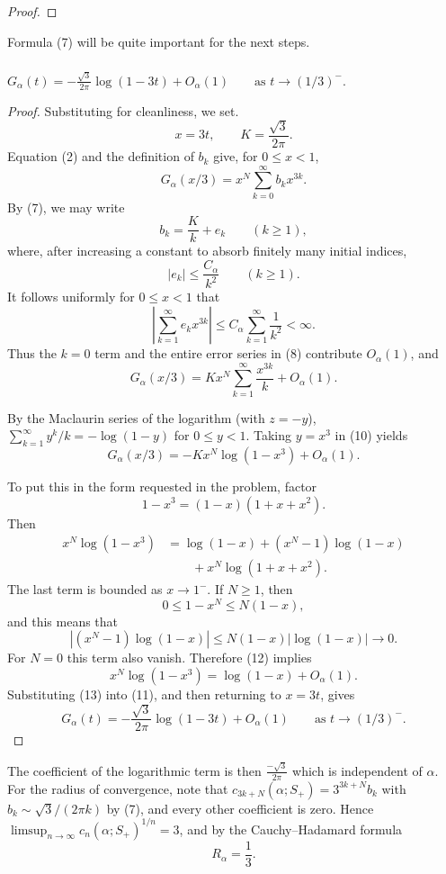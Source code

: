 \documentclass[11pt]{scrartcl}
\begin{document}
\begin{soln}
\begin{proof}
    \end{proof}

	Formula (7) will be quite important for the next steps.






	\subsubsection*{}
	
    \begin{claim*}
       $ G_\alpha(t)
		=-\frac{\sqrt3}{2\pi}\log(1-3t)+O_\alpha(1)
		\qquad\text{as }t\to(1/3)^-$.
    \end{claim*}
    \begin{proof}
        
	Substituting for cleanliness, we set. 
	\[
	x=3t,
	\qquad
	K=\frac{\sqrt3}{2\pi}.
	\]
	Equation (2) and the definition of $b_k$ give, for $0\le x<1$,
	\[
	G_\alpha(x/3)=x^N\sum_{k=0}^{\infty}b_kx^{3k}.
	\tag{8}
	\]
	By (7), we may write
	\[
	b_k=\frac{K}{k}+e_k
	\qquad(k\ge1),
	\]
	where, after increasing a constant to absorb finitely many initial
	indices,
	\[
	|e_k|\le\frac{C_\alpha}{k^2}
	\qquad(k\ge1).
	\tag{9}
	\]
	It follows uniformly for $0\le x<1$ that
	\[
	\left|\sum_{k=1}^{\infty}e_kx^{3k}\right|
	\le C_\alpha\sum_{k=1}^{\infty}\frac1{k^2}
	<\infty.
	\]
	Thus the $k=0$ term and the entire error series in (8) contribute
	$O_\alpha(1)$, and
	\[
	G_\alpha(x/3)
	=Kx^N\sum_{k=1}^{\infty}\frac{x^{3k}}{k}
	+O_\alpha(1).
	\tag{10}
	\]
	
	By the Maclaurin series of the logarithm \cite[(4.6.1)]{dlmf}
(with $z=-y$), $\sum_{k=1}^{\infty}y^k/k=-\log(1-y)$ for $0\le y<1$.
Taking $y=x^3$ in (10) yields
\[
G_\alpha(x/3)=-Kx^N\log(1-x^3)+O_\alpha(1).
\tag{11}
\]
	
	To put this in the form requested in the problem, factor
	\[
	1-x^3=(1-x)(1+x+x^2).
	\]
	Then
	\begin{align*}
		x^N\log(1-x^3)
		&=\log(1-x)+(x^N-1)\log(1-x)\\
		&\qquad+x^N\log(1+x+x^2).
		\tag{12}
	\end{align*}
	The last term is bounded as $x\to1^-$. If $N\ge1$, then
	\[
	0\le1-x^N\le N(1-x),
	\]
	and this means that 
	\[
	|(x^N-1)\log(1-x)|
	\le N(1-x)|\log(1-x)|\longrightarrow0.
	\]
	For $N=0$ this term also vanish. Therefore (12) implies
	\[
	x^N\log(1-x^3)=\log(1-x)+O_\alpha(1).
	\tag{13}
	\]
	Substituting (13) into (11), and then returning to $x=3t$, gives
	\[
	\boxed{
		G_\alpha(t)
		=-\frac{\sqrt3}{2\pi}\log(1-3t)+O_\alpha(1)
		\qquad\text{as }t\to(1/3)^-.
	}
	\tag{14}
	\]
	\end{proof}
    The coefficient of the logarithmic term is then $\frac{-\sqrt{3}}{2\pi}$ which is independent of
    $\alpha$.
	For the radius of convergence, note that $c_{3k+N}(\alpha;S_+)=3^{3k+N}b_k$
with $b_k\sim\sqrt3/(2\pi k)$ by (7), and every other coefficient is zero.
Hence $\limsup_{n\to\infty}c_n(\alpha;S_+)^{1/n}=3$, and by the
Cauchy--Hadamard formula
\[
\boxed{R_\alpha=\frac13}.
\]
	
\end{soln}
\end{document}
